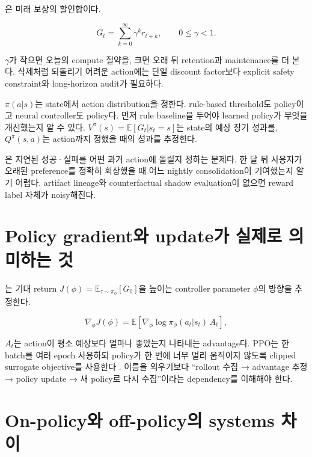 은 미래 보상의 할인합이다.

\begin{equation}
G_t=\sum_{k=0}^{\infty}\gamma^k r_{t+k},\qquad 0\le\gamma<1.
\end{equation}

$\gamma$가 작으면 오늘의 compute 절약을, 크면 오래 뒤 retention과 maintenance를 더 본다. 삭제처럼
되돌리기 어려운 action에는 단일 discount factor보다 explicit safety constraint와 long-horizon audit가
필요하다.

 $\pi(a|s)$는 state에서 action distribution을 정한다. rule-based threshold도
policy이고 neural controller도 policy다. 먼저 rule baseline을 두어야 learned policy가 무엇을 개선했는지
알 수 있다.  $V^\pi(s)=\mathbb{E}[G_t|s_t=s]$는 state의 예상 장기
성과를, $Q^\pi(s,a)$는 action까지 정했을 때의 성과를 추정한다.

은 지연된 성공·실패를 어떤 과거 action에 돌릴지 정하는 문제다.
한 달 뒤 사용자가 오래된 preference를 정확히 회상했을 때 어느 nightly consolidation이 기여했는지
알기 어렵다. artifact lineage와 counterfactual shadow evaluation이 없으면 reward label 자체가 noisy해진다.

\section{Policy gradient와 update가 실제로 의미하는 것}

는 기대 return
$J(\phi)=\mathbb{E}_{\tau\sim\pi_\phi}[G_0]$을 높이는 controller parameter $\phi$의 방향을 추정한다.

\begin{equation}
\nabla_\phi J(\phi)=\mathbb{E}\left[
\nabla_\phi\log\pi_\phi(a_t|s_t)\,A_t\right],
\end{equation}

$A_t$는 action이 평소 예상보다 얼마나 좋았는지 나타내는 advantage다. PPO는 한 batch를 여러 epoch
사용하되 policy가 한 번에 너무 멀리 움직이지 않도록 clipped surrogate objective를 사용한다
\parencite{schulman2017ppo}. 이름을 외우기보다 ``rollout 수집 → advantage 추정 → policy update →
새 policy로 다시 수집''이라는 dependency를 이해해야 한다.

\section{On-policy와 off-policy의 systems 차이}

